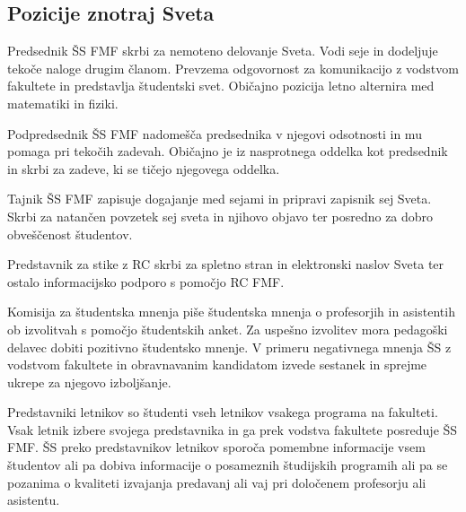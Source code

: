 \documentclass[a4paper,oneside,12pt]{article}
\theoremstyle{definition}
\newenvironment{description*}{\vspace{-6pt}\begin{description}\setlength{\itemsep}{0pt}\setlength{\parskip}{2pt}}{\end{description}\vspace{-1\parskip}}
\begin{document}
\subsection*{Pozicije znotraj Sveta}
\begin{description*}
  \item[Predsednik ŠS FMF] skrbi za nemoteno delovanje Sveta. Vodi seje in dodeljuje tekoče naloge
    drugim članom. Prevzema odgovornost za komunikacijo z vodstvom fakultete in predstavlja
    študentski svet. Običajno pozicija letno alternira med matematiki in fiziki.
  \item[Podpredsednik ŠS FMF] nadomešča predsednika v njegovi odsotnosti in mu pomaga pri tekočih
    zadevah. Običajno je iz nasprotnega oddelka kot predsednik in skrbi za zadeve, ki se tičejo
    njegovega oddelka.
  \item[Tajnik ŠS FMF] zapisuje dogajanje med sejami in pripravi zapisnik sej Sveta. Skrbi za
    natančen povzetek sej sveta in njihovo objavo ter posredno za dobro obveščenost študentov.
  \item[Predstavnik za stike z RC] skrbi za spletno stran in elektronski naslov Sveta ter ostalo
    informacijsko podporo s pomočjo RC FMF.
  \item[Komisija za študentska mnenja] piše študentska mnenja o profesorjih in asistentih ob
    izvolitvah s pomočjo študentskih anket. Za uspešno izvolitev mora pedagoški delavec dobiti
    pozitivno študentsko mnenje. V primeru negativnega mnenja ŠS z vodstvom fakultete in
    obravnavanim kandidatom izvede sestanek in sprejme ukrepe za njegovo izboljšanje.
  \item[Predstavniki letnikov] so študenti vseh letnikov vsakega programa na fakulteti. Vsak letnik
    izbere svojega predstavnika in ga prek vodstva fakultete posreduje ŠS FMF. ŠS preko
    predstavnikov letnikov sporoča pomembne informacije vsem študentov ali pa dobiva informacije o
    posameznih študijskih programih ali pa se pozanima o kvaliteti izvajanja predavanj ali vaj pri
    določenem profesorju ali asistentu.
\end{description*}
\end{document}
